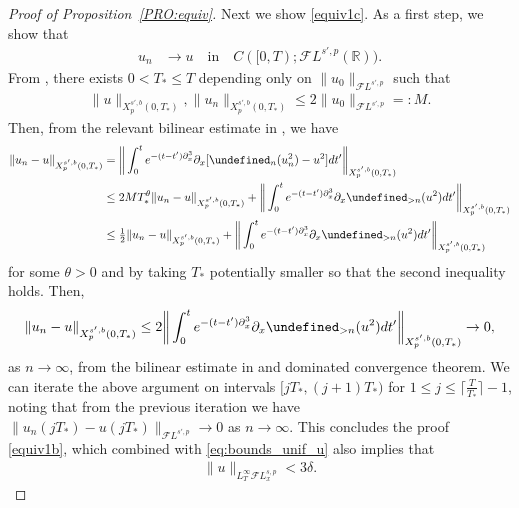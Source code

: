 \documentclass[a4paper,
11pt,  reqno]{amsart}
\newcommand{\5}{\textup{V}}
\newcommand{\FL}{\mathcal{F} L}
\newcommand{\dl}{\delta}
\newcommand{\dx}{\partial_x}
\theoremstyle{remark}
\newcommand{\R}{\mathbb{R}}
\let\P= \undefined
\newcommand{\P}{\mathbf{P}}
\newcommand{\ta}{\theta}
\numberwithin{equation}{section}
\numberwithin{theorem}{section}
\begin{document}
\begin{proof}[Proof of Proposition~\ref{PRO:equiv}]
Next we show \eqref{equiv1c}.
As a first step, we show that
\begin{align}
\label{equiv1b}
u_n & \to u \quad \text{in} \quad    C([0,T); \FL^{s',p}(\R)).
\end{align}
From \cite{Grunrock_ldv_hier}, there exists $0< T_* \le T$ depending only on $\| u_0\|_{\FL^{s',p}}$ such that
\begin{align}
\| u\|_{X^{s',b}_p(0,T_*)}, \| u_n\|_{X^{s',b}_p(0,T_*)} \le 2 \| u_0\|_{\FL^{s',p}} =: M.
\end{align}
Then, from the relevant bilinear estimate in \cite{Grunrock_ldv_hier}, we have
\begin{align}
\| u_n - u\|_{X^{s',b}_p(0,T_*)}
&
= \bigg\| \int_0^t e^{-(t-t')\dx^3} \dx [ \P_n (u_n^2) - u^2 ] dt' \bigg\|_{X^{s',b}_p(0,T_*)}
\\
&
\le 2M T_*^\ta \| u_n - u \|_{X^{s',b}_p(0,T_*)} + \bigg\| \int_0^t e^{-(t-t')\dx^3} \dx \P_{>n} (u^2)  dt' \bigg\|_{X^{s',b}_p(0,T_*)}
\\
&
\le \tfrac12 \| u_n - u \|_{X^{s',b}_p(0,T_*)} + \bigg\| \int_0^t e^{-(t-t')\dx^3} \dx \P_{>n} (u^2)  dt' \bigg\|_{X^{s',b}_p(0,T_*)}
\end{align}
for some $\ta>0$ and by taking $T_*$ potentially smaller so that the second inequality holds. Then,
\begin{align}
\| u_n - u\|_{X^{s',b}_p(0,T_*)}
\le 2  \bigg\| \int_0^t e^{-(t-t')\dx^3} \dx \P_{>n} (u^2)  dt' \bigg\|_{X^{s',b}_p(0,T_*)} \to 0 ,
\end{align}
as $n\to\infty$, from the bilinear estimate in \cite{Grunrock_ldv_hier} and dominated convergence theorem.
We can iterate the above argument on intervals $[ jT_*, (j+1)T_* )$ for $1 \le j \le \lceil \frac{T}{T_*} \rceil -1 $, noting that from the previous iteration we have $\| u_n( jT_*) - u(jT_*) \|_{\FL^{s',p}} \to 0$ as $n\to\infty$. This concludes the proof \eqref{equiv1b}, which combined with \eqref{eq:bounds_unif_u} also implies that
\begin{align}
\label{equiv1bb}
\| u \|_{L^\infty_T \FL^{s,p}_x} < 3 \dl .
\end{align}





\end{proof}
\end{document}
